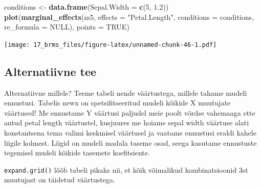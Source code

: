 \documentclass[]{book}
\newenvironment{Shaded}{\begin{snugshade}}{\end{snugshade}}
\newcommand{\KeywordTok}[1]{\textcolor[rgb]{0.13,0.29,0.53}{\textbf{#1}}}
\newcommand{\DataTypeTok}[1]{\textcolor[rgb]{0.13,0.29,0.53}{#1}}
\newcommand{\DecValTok}[1]{\textcolor[rgb]{0.00,0.00,0.81}{#1}}
\newcommand{\FloatTok}[1]{\textcolor[rgb]{0.00,0.00,0.81}{#1}}
\newcommand{\StringTok}[1]{\textcolor[rgb]{0.31,0.60,0.02}{#1}}
\newcommand{\OtherTok}[1]{\textcolor[rgb]{0.56,0.35,0.01}{#1}}
\newcommand{\OperatorTok}[1]{\textcolor[rgb]{0.81,0.36,0.00}{\textbf{#1}}}
\newcommand{\NormalTok}[1]{#1}
\begin{document}
\begin{Shaded}
\begin{Highlighting}[]
\NormalTok{conditions <-}\StringTok{ }\KeywordTok{data.frame}\NormalTok{(}\DataTypeTok{Sepal.Width =} \KeywordTok{c}\NormalTok{(}\DecValTok{5}\NormalTok{, }\FloatTok{1.2}\NormalTok{))}
\KeywordTok{plot}\NormalTok{(}\KeywordTok{marginal_effects}\NormalTok{(m5, }\DataTypeTok{effects =} \StringTok{"Petal.Length"}\NormalTok{, }\DataTypeTok{conditions =}\NormalTok{ conditions, }\DataTypeTok{re_formula =} \OtherTok{NULL}\NormalTok{), }\DataTypeTok{points =} \OtherTok{TRUE}\NormalTok{)}
\end{Highlighting}
\end{Shaded}

\texttt{[image: 17\_brms\_files/figure-latex/unnamed-chunk-46-1.pdf]}

\subsection{Alternatiivne tee}\label{alternatiivne-tee}

Alternatiivne millele? Teeme tabeli nende väärtustega, millele tahame
mudeli ennustusi. Tabelis newx on spetsifitseeritud mudeli kõikide X
muutujate väärtused! Me ennustame Y väärtusi paljudel meie poolt võrdse
vahemaaga ette antud petal length väärtustel, kusjuures me hoiame sepal
width väärtuse alati konstantsena tema valimi keskmisel väärtusel ja
vaatame ennustusi eraldi kahele liigile kolmest. Liigid on mudeli madala
taseme osad, seega kasutame ennustuste tegemisel mudeli kõikide tasemete
koefitsiente.

\begin{Shaded}
\end{Shaded}

\texttt{expand.grid()} lõõb tabeli pikaks nii, et kõik võimalikud
kombinatsioonid 3st muutujast on täidetud väärtustega.
\end{document}
